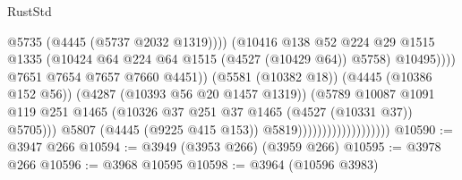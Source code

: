 \begin{lexlean}{RustStd}
\begin{coremodule}
                                                          @5735
                                                          (@4445 (@5737 @2032 @1319))))
                                                      (@10416
                                                        @138
                                                        @52
                                                        @224
                                                        @29
                                                        @1515
                                                        @1335
                                                        (@10424
                                                          @64
                                                          @224
                                                          @64
                                                          @1515
                                                          (@4527 (@10429 @64))
                                                          @5758)
                                                        @10495))))
                                                @7651
                                                @7654
                                                @7657
                                                @7660
                                                @4451))
                                            (@5581 (@10382 @18))
                                            (@4445 (@10386 @152 @56))
                                            (@4287 (@10393 @56 @20 @1457 @1319))
                                            (@5789
                                              @10087
                                              @1091
                                              @119
                                              @251
                                              @1465
                                              (@10326
                                                @37
                                                @251
                                                @37
                                                @1465
                                                (@4527 (@10331 @37))
                                                @5705)))
                                          @5807
                                          (@4445 (@9225 @415 @153))
                                          @5819)))))))))))))))))))
@10590 := @3947 @266
@10594 := @3949 (@3953 @266) (@3959 @266)
@10595 := @3978 @266
@10596 := @3968 @10595
@10598 := @3964 (@10596 @3983)

\end{coremodule}
\end{lexlean}
